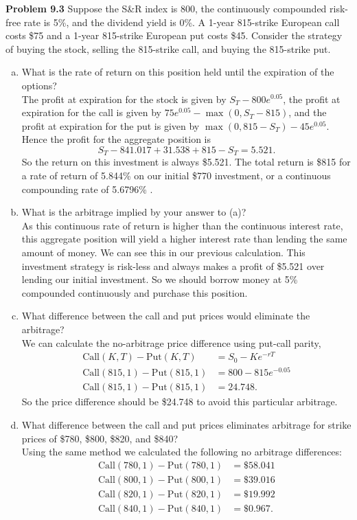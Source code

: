 \documentclass[12pt]{article}
\newcommand{\problem}[1]{\bigskip \noindent \textbf{Problem #1}}
\newcommand{\Call}{\text{Call}}
\newcommand{\Put}{\text{Put}}
\theoremstyle{plain}
\begin{document}
\problem{9.3} Suppose the S\&R index is 800, the continuously compounded risk-free rate is 5\%, and the dividend yield is 0\%. A 1-year 815-strike European call costs \$75 and a 1-year 815-strike European put costs \$45. Consider the strategy of buying the stock, selling the 815-strike call, and buying the 815-strike put.
\begin{enumerate}[(a)]
\item What is the rate of return on this position held until the expiration of the options?\\

The profit at expiration for the stock is given by $S_T - 800e^{0.05}$, the profit at expiration for the call is given by $75e^{0.05} - \max(0,S_T - 815)$, and the profit at expiration for the put is given by $\max(0,815-S_T) - 45e^{0.05}$. Hence the profit for the aggregate position is
\[
S_T- 841.017 + 31.538 + 815 - S_T = 5.521.
\]
So the return on this investment is always \$5.521. The total return is \$815 for a rate of return of 5.844\% on our initial \$770 investment, or a continuous compounding rate of 5.6796\% .

\item What is the arbitrage implied by your answer to (a)?\\

As this continuous rate of return is higher than the continuous interest rate, this aggregate position will yield a higher interest rate than lending the same amount of money. We can see this in our previous calculation. This investment strategy is risk-less and always makes a profit of \$5.521 over lending our initial investment. So we should borrow money at 5\% compounded continuously and purchase this position.

\item What difference between the call and put prices would eliminate the arbitrage?\\

We can calculate the no-arbitrage price difference using put-call parity,
\begin{align*}
\Call(K,T) - \Put(K,T) &= S_0 - Ke^{-rT}\\
\Call(815,1) - \Put(815,1) &= 800 - 815e^{-0.05} \\
\Call(815,1) - \Put(815,1) &= 24.748.
\end{align*}
So the price difference should be \$24.748 to avoid this particular arbitrage.

\item What difference between the call and put prices eliminates arbitrage for strike prices of \$780, \$800, \$820, and \$840?\\

Using the same method we calculated the following no arbitrage differences:
\begin{align*}
\Call(780,1) - \Put(780,1) &= \$58.041\\
\Call(800,1) - \Put(800,1) &= \$39.016\\
\Call(820,1) - \Put(820,1) &= \$19.992\\
\Call(840,1) - \Put(840,1) &= \$0.967.
\end{align*}
\end{enumerate}
\end{document}
